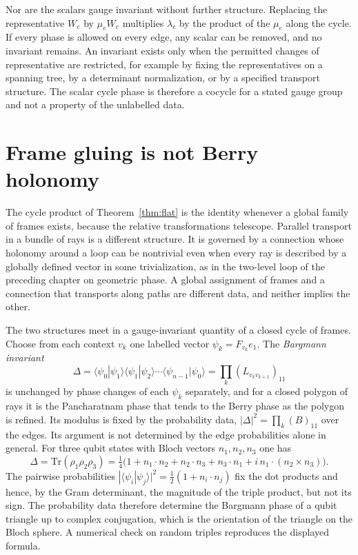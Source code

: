 \documentclass[11pt,oneside]{book}
\theoremstyle{definition}
\theoremstyle{remark}
\begin{document}
Nor are the scalars gauge invariant without further structure. Replacing the representative $W_e$ by $\mu_eW_e$ multiplies $\lambda_c$ by the product of the $\mu_e$ along the cycle. If every phase is allowed on every edge, any scalar can be removed, and no invariant remains. An invariant exists only when the permitted changes of representative are restricted, for example by fixing the representatives on a spanning tree, by a determinant normalization, or by a specified transport structure. The scalar cycle phase is therefore a cocycle for a stated gauge group and not a property of the unlabelled data.

\section*{Frame gluing is not Berry holonomy}

The cycle product of Theorem~\ref{thm:flat} is the identity whenever a global family of frames exists, because the relative transformations telescope. Parallel transport in a bundle of rays is a different structure. It is governed by a connection whose holonomy around a loop can be nontrivial even when every ray is described by a globally defined vector in some trivialization, as in the two-level loop of the preceding chapter on geometric phase. A global assignment of frames and a connection that transports along paths are different data, and neither implies the other.

The two structures meet in a gauge-invariant quantity of a closed cycle of frames. Choose from each context $v_k$ one labelled vector $\psi_k=F_{v_k}e_1$. The \emph{Bargmann invariant}
\[
\Delta=\langle\psi_0|\psi_1\rangle\langle\psi_1|\psi_2\rangle\cdots\langle\psi_{n-1}|\psi_0\rangle=\prod_k(L_{v_kv_{k+1}})_{11}
\]
is unchanged by phase changes of each $\psi_k$ separately, and for a closed polygon of rays it is the Pancharatnam phase that tends to the Berry phase as the polygon is refined. Its modulus is fixed by the probability data, $|\Delta|^2=\prod_k(B)_{11}$ over the edges. Its argument is not determined by the edge probabilities alone in general. For three qubit states with Bloch vectors $n_1,n_2,n_3$ one has
\[
\Delta=\mathrm{Tr}(\rho_1\rho_2\rho_3)=\tfrac14\bigl(1+n_1\!\cdot\! n_2+n_2\!\cdot\! n_3+n_3\!\cdot\! n_1+i\,n_1\!\cdot\!(n_2\times n_3)\bigr).
\]
The pairwise probabilities $|\langle\psi_i|\psi_j\rangle|^2=\tfrac12(1+n_i\cdot n_j)$ fix the dot products and hence, by the Gram determinant, the magnitude of the triple product, but not its sign. The probability data therefore determine the Bargmann phase of a qubit triangle up to complex conjugation, which is the orientation of the triangle on the Bloch sphere. A numerical check on random triples reproduces the displayed formula.
\end{document}
